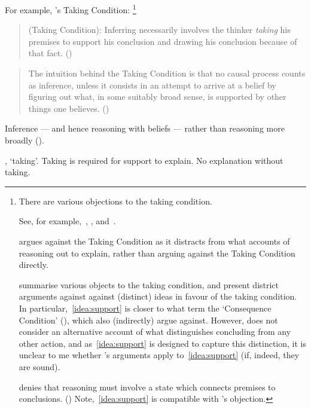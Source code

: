 \begin{note}
  For example, \citeauthor{Boghossian:2014aa}'s Taking Condition:%
  \footnote{
    There are various objections to the taking condition.

    See, for example,~\textcite{Hlobil:2014tq}, \textcite{McHugh:2016vp}, and~\textcite{Wright:2014tt}.

    \citeauthor{Hlobil:2014tq} argues against the Taking Condition as it distracts from what accounts of reasoning out to explain, rather than arguing against the Taking Condition directly.

    \citeauthor{McHugh:2016vp} summarise various objects to the taking condition, and present district arguments against against (distinct) ideas in favour of the taking condition.
    In particular,~\autoref{idea:support} is closer to what \citeauthor{McHugh:2016vp} term the `Consequence Condition' (\citeyear[cf.][316]{McHugh:2016vp}), which \citeauthor{McHugh:2016vp} also (indirectly) argue against.
    However, \citeauthor{McHugh:2016vp} does not consider an alternative account of what distinguishes concluding from any other action, and as~\autoref{idea:support} is designed to capture this distinction, it is unclear to me whether \citeauthor{McHugh:2016vp}'s arguments apply to~\autoref{idea:support} (if, indeed, they are sound).

    \citeauthor{Wright:2014tt} denies that reasoning must involve a state which connects premises to conclusions. (\citeyear[Cf.][33-34]{Wright:2014tt})
    Note,~\autoref{idea:support} is compatible with \citeauthor{Wright:2014tt}'s objection.
  }

  \begin{quote}
    (Taking Condition):
    Inferring necessarily involves the thinker \emph{taking} his premises to support his conclusion and drawing his conclusion because of that fact.%
    \mbox{}\hfill\mbox{(\citeyear[5]{Boghossian:2014aa})}
  \end{quote}

  \begin{quote}
    The intuition behind the Taking Condition is that no causal process counts as inference, unless it consists in an attempt to arrive at a belief by figuring out what, in some suitably broad sense, is supported by other things one believes.%
    \mbox{}\hfill\mbox{(\citeyear[5]{Boghossian:2014aa})}
  \end{quote}

  Inference --- and hence reasoning with beliefs --- rather than reasoning more broadly (\citeyear[cf][2]{Boghossian:2014aa}).

  \citeauthor{Boghossian:2014aa}, `taking'.
  Taking is required for support to explain.
  No explanation without taking.
\end{note}

